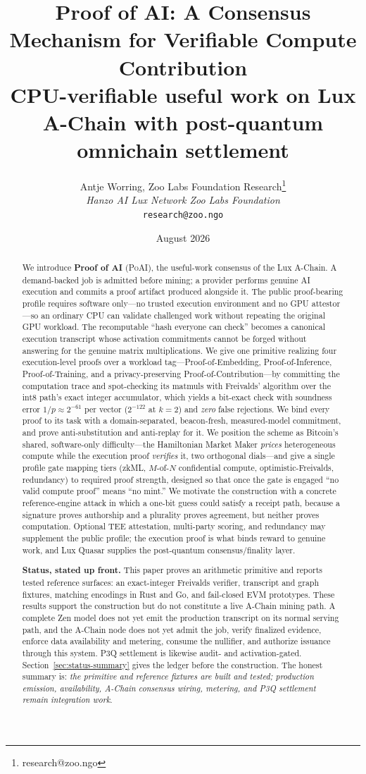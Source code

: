 \documentclass[11pt,letterpaper]{article}
\title{\textbf{Proof of AI: A Consensus Mechanism for Verifiable Compute Contribution}\\
\large CPU-verifiable useful work on Lux A-Chain with post-quantum omnichain settlement}
\author{
Antje Worring, Zoo Labs Foundation Research\thanks{research@zoo.ngo}\\
\textit{Hanzo AI \quad Lux Network \quad Zoo Labs Foundation}\\
\texttt{research@zoo.ngo}
}
\date{August 2026}
\theoremstyle{remark}
\theoremstyle{plain}
\newcommand{\PoAI}{\textsc{PoAI}}
\begin{document}
\zoocoverpage

\begin{abstract}
We introduce \textbf{Proof of AI} (\PoAI{}), the useful-work consensus of the Lux
A-Chain. A demand-backed job is admitted before mining; a provider performs genuine AI
execution and commits a proof artifact produced alongside it. The public proof-bearing
profile requires software only---no trusted execution environment and no GPU attestor---so
an ordinary CPU can validate challenged work without repeating the original GPU workload.
The recomputable ``hash everyone can check'' becomes a canonical execution transcript
whose activation commitments cannot be forged without answering for the genuine matrix
multiplications. We give one primitive realizing four
execution-level proofs over a workload tag---Proof-of-Embedding, Proof-of-Inference,
Proof-of-Training, and a privacy-preserving Proof-of-Contribution---by committing the
computation trace and spot-checking its matmuls with Freivalds' algorithm over the
int8 path's exact integer accumulator, which yields a bit-exact check with soundness
error $1/p \approx 2^{-61}$ per vector ($2^{-122}$ at $k{=}2$) and \emph{zero} false
rejections. We bind every proof to its task with a domain-separated,
beacon-fresh, measured-model commitment, and prove anti-substitution and anti-replay
for it. We position the scheme as Bitcoin's shared, software-only difficulty---the
Hamiltonian Market Maker \emph{prices} heterogeneous compute while the execution proof
\emph{verifies} it, two orthogonal dials---and give a single profile gate mapping tiers
(zkML, $M$-of-$N$ confidential compute, optimistic-Freivalds, redundancy) to required
proof strength, designed so that once the gate is engaged ``no valid compute proof''
means ``no mint.'' We motivate the construction with a concrete reference-engine attack
in which a one-bit guess could satisfy a receipt path, because a signature proves
authorship and a plurality proves agreement, but neither proves computation. Optional
TEE attestation, multi-party scoring, and redundancy may supplement the public profile;
the execution proof is what binds reward to genuine work, and Lux Quasar supplies the
post-quantum consensus/finality layer.

\textbf{Status, stated up front.} This paper proves an arithmetic primitive and reports
tested reference surfaces: an exact-integer Freivalds verifier, transcript and graph
fixtures, matching encodings in Rust and Go, and fail-closed EVM prototypes. These results
support the construction but do not constitute a live A-Chain mining path. A complete Zen
model does not yet emit the production transcript on its normal serving path, and the
A-Chain node does not yet admit the job, verify finalized evidence, enforce data
availability and metering, consume the nullifier, and authorize issuance through this
system. P3Q settlement is likewise audit- and activation-gated. Section~\ref{sec:status-summary}
gives the ledger before the construction. The honest summary is: \emph{the primitive and
reference fixtures are built and tested; production emission, availability, A-Chain
consensus wiring, metering, and P3Q settlement remain integration work}.


\end{abstract}
\end{document}
